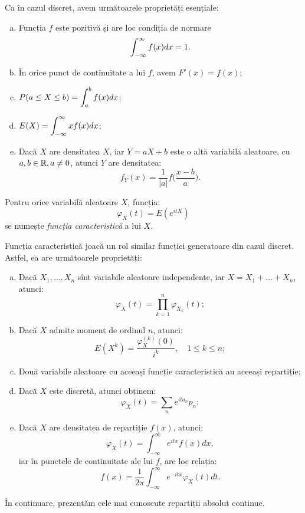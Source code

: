 Ca în cazul discret, avem următoarele proprietăți esențiale:
\begin{enumerate}[(a)]
\item Funcția $ f $ este pozitivă și are loc condiția de normare
  \[
    \displaystyle\int_{-\infty}^\infty f(x) dx = 1.
  \]
\item În orice punct de continuitate a lui $ f $, avem $ F'(x) = f(x) $;
\item $ P(a \leq X \leq b) = \displaystyle\int_a^b f(x) dx $;
\item $ E(X) = \displaystyle\int_{-\infty}^\infty xf(x) dx $;
\item Dacă $ X $ are densitatea $ X $, iar $ Y = aX + b $ este o altă variabilă
  aleatoare, cu $ a, b \in \mathbb{R}, a \neq 0 $, atunci $ Y $ are densitatea:
  \[
    f_Y(x) = \frac{1}{|a|} f \Big( \frac{x - b}{a} \Big).
  \]
\end{enumerate}

\begin{definition}\label{def:fc-car}
  Pentru orice variabilă aleatoare $ X $, funcția:
  \[
    \varphi_X(t) = E(e^{itX})
  \]
  se numește \emph{funcția caracteristică} a lui $ X $.
\end{definition}

Funcția caracteristică joacă un rol similar funcției generatoare din cazul discret.
Astfel, ea are următoarele proprietăți:
\begin{enumerate}[(a)]
\item Dacă $ X_1, \dots, X_n $ sînt variabile aleatoare independente, iar
  $ X = X_1 + \dots + X_n  $, atunci:
  \[
    \varphi_X(t) = \prod_{k = 1}^n \varphi_{X_k}(t);
  \]
\item Dacă $ X $ admite moment de ordinul $ n $, atunci:
  \[
    E(X^k) = \frac{\varphi_X^{(k)}(0)}{i^k}, \quad 1 \leq k \leq n;
  \]
\item Două variabile aleatoare cu aceeași funcție caracteristică au aceeași repartiție;
\item Dacă $ X $ este discretă, atunci obținem:
  \[
    \varphi_X(t) = \sum_n e^{ita_n} p_n;
  \]
\item Dacă $ X $ are densitatea de repartiție $ f(x) $, atunci:
  \[
    \varphi_X(t) = \int_{-\infty}^\infty e^{itx} f(x) dx,
  \]
  iar în punctele de continuitate ale lui $ f $, are loc relația:
  \[
    f(x) = \frac{1}{2\pi} \int_{-\infty}^\infty e^{-itx} \varphi_X(t) dt.
  \]
\end{enumerate}

În continuare, prezentăm cele mai cunoscute repartiții absolut continue.

